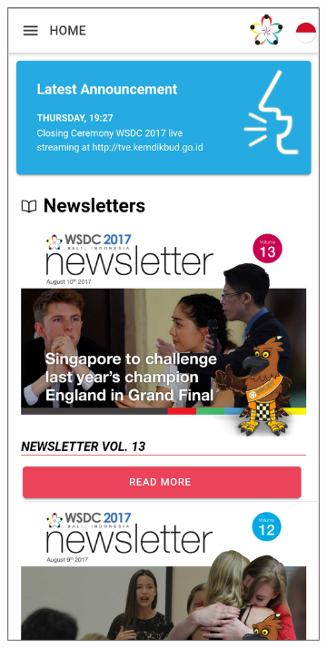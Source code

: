 \begin{figure}[H]
     \centering
     \begin{subfigure}[b]{0.3\textwidth}
         \centering
         \includegraphics[width=\textwidth]{Gambar/SSHome.png}

\end{subfigure}
\end{figure}
